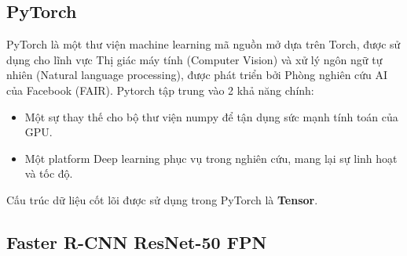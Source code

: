 \documentclass[a4paper, 12pt]{report}
\begin{document}
\subsection{PyTorch}
PyTorch là một thư viện machine learning mã nguồn mở dựa trên Torch, được sử dụng cho lĩnh vực Thị giác máy tính (Computer Vision) và xử lý ngôn ngữ tự nhiên (Natural language processing), được phát triển bởi Phòng nghiên cứu AI của Facebook (FAIR). Pytorch tập trung vào 2 khả năng chính:
\begin{itemize}
	\item Một sự thay thế cho bộ thư viện numpy để tận dụng sức mạnh tính toán của GPU.
	\item Một platform Deep learning phục vụ trong nghiên cứu, mang lại sự linh hoạt và tốc độ.
\end{itemize}
Cấu trúc dữ liệu cốt lõi được sử dụng trong PyTorch là \textbf{Tensor}.\par
\subsection{Faster R-CNN ResNet-50 FPN}
\end{document}
